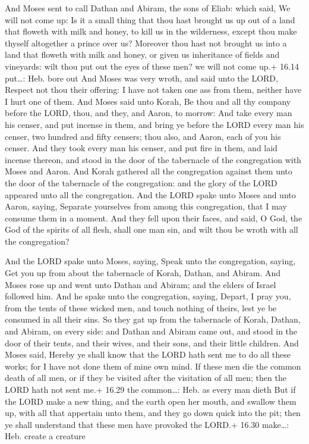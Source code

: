  And Moses sent to call Dathan and Abiram, the sons of
Eliab: which said, We will not come up:  Is it a small
thing that thou hast brought us up out of a land that floweth with milk
and honey, to kill us in the wilderness, except thou make thyself
altogether a prince over us?  Moreover thou hast not
brought us into a land that floweth with milk and honey, or given us
inheritance of fields and vineyards: wilt thou put out the eyes of these
men? we will not come up.+ 16.14 put\ldots: Heb. bore out 
And Moses was very wroth, and said unto the LORD, Respect not thou their
offering: I have not taken one ass from them, neither have I hurt one of
them.  And Moses said unto Korah, Be thou and all thy
company before the LORD, thou, and they, and Aaron, to morrow:
 And take every man his censer, and put incense in them,
and bring ye before the LORD every man his censer, two hundred and fifty
censers; thou also, and Aaron, each of you his censer.  And
they took every man his censer, and put fire in them, and laid incense
thereon, and stood in the door of the tabernacle of the congregation
with Moses and Aaron.  And Korah gathered all the
congregation against them unto the door of the tabernacle of the
congregation: and the glory of the LORD appeared unto all the
congregation.  And the LORD spake unto Moses and unto
Aaron, saying,  Separate yourselves from among this
congregation, that I may consume them in a moment.  And
they fell upon their faces, and said, O God, the God of the spirits of
all flesh, shall one man sin, and wilt thou be wroth with all the
congregation?

 And the LORD spake unto Moses, saying, 
Speak unto the congregation, saying, Get you up from about the
tabernacle of Korah, Dathan, and Abiram.  And Moses rose up
and went unto Dathan and Abiram; and the elders of Israel followed him.
 And he spake unto the congregation, saying, Depart, I pray
you, from the tents of these wicked men, and touch nothing of theirs,
lest ye be consumed in all their sins.  So they gat up from
the tabernacle of Korah, Dathan, and Abiram, on every side: and Dathan
and Abiram came out, and stood in the door of their tents, and their
wives, and their sons, and their little children.  And
Moses said, Hereby ye shall know that the LORD hath sent me to do all
these works; for I have not done them of mine own mind.  If
these men die the common death of all men, or if they be visited after
the visitation of all men; then the LORD hath not sent me.+ 16.29 the
common\ldots: Heb. as every man dieth  But if the LORD make
a new thing, and the earth open her mouth, and swallow them up, with all
that appertain unto them, and they go down quick into the pit; then ye
shall understand that these men have provoked the LORD.+ 16.30
make\ldots: Heb. create a creature

